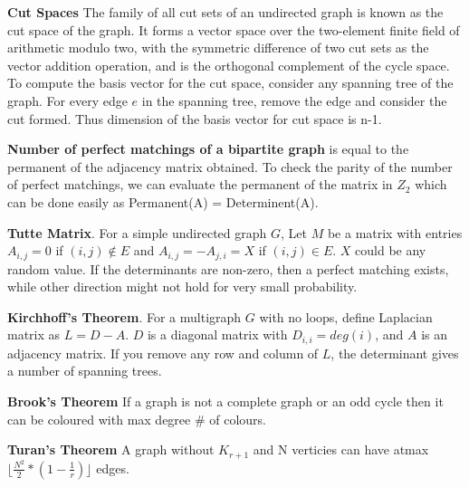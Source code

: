 \textbf{Cut Spaces} The family of all cut sets of an undirected graph is known as the cut space of the graph. It forms a vector space over the two-element finite field of arithmetic modulo two, with the symmetric difference of two cut sets as the vector addition operation, and is the orthogonal complement of the cycle space. To compute the basis vector for the cut space, consider any spanning tree of the graph. For every edge $e$ in the spanning tree, remove the edge and consider the cut formed. Thus dimension of the basis vector for cut space is n-1.

\textbf{Number of perfect matchings of a bipartite graph} is equal to the permanent of the adjacency matrix obtained. To check the parity of the number of perfect matchings, we can evaluate the permanent of the matrix in $Z_{2}$ which can be done easily as Permanent(A) = Determinent(A).

\textbf{Tutte Matrix}. For a simple undirected graph $G$, Let $M$ be a matrix with entries $A_{i, j} = 0$ if $(i, j) \notin E$ and $A_{i, j} = -A_{j, i} = X$ if $(i, j) \in E$. $X$ could be any random value. If the determinants are non-zero, then a perfect matching exists, while other direction might not hold for very small probability.

\textbf{Kirchhoff's Theorem}. For a multigraph $G$ with no loops, define Laplacian matrix as $L = D - A$. $D$ is a diagonal matrix with $D_{i, i} = deg(i)$, and $A$ is an adjacency matrix. If you remove any row and column of $L$, the determinant gives a number of spanning trees.

\textbf{Brook's Theorem} If a graph is not a complete graph or an odd cycle then it can be coloured with max degree \# of colours.

\textbf{Turan's Theorem} A graph without $K_{r+1}$ and N verticies can have atmax $\lfloor \frac{N^{2}}{2} * (1 - \frac{1}{r}) \rfloor$ edges. 
